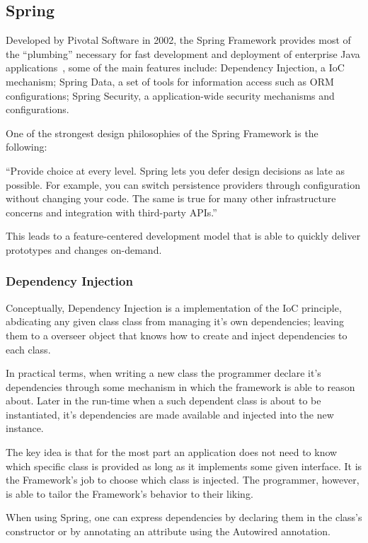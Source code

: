 \subsection{Spring}
Developed by Pivotal Software in 2002, the Spring Framework provides most of the ``plumbing'' necessary for fast development and deployment of enterprise Java applications~\cite{springdocs}, some of the main features include: Dependency Injection, a \gls{IoC} mechanism; Spring Data, a set of tools for information access such as \gls{ORM} configurations; Spring Security, a application-wide security mechanisms and configurations.

One of the strongest design philosophies of the Spring Framework is the following:
\begin{displayquote}
``Provide choice at every level. Spring lets you defer design decisions as late as possible. For example, you can switch persistence providers through configuration without changing your code. The same is true for many other infrastructure concerns and integration with third-party \gls{API}s.''~\cite{springdocs}
\end{displayquote}
This leads to a feature-centered development model that is able to quickly deliver prototypes and changes on-demand.

\subsubsection{Dependency Injection}
Conceptually, Dependency Injection is a implementation of the \gls{IoC} principle, abdicating any given class class from managing it's own dependencies; leaving them to a overseer object that knows how to create and inject dependencies to each class\cite{inversion}.

In practical terms, when writing a new class the programmer declare it's dependencies through some mechanism in which the framework is able to reason about. Later in the run-time when a such dependent class is about to be instantiated, it's dependencies are made available and injected into the new instance.

The key idea is that for the most part an application does not need to know which specific class is provided as long as it implements some given interface. It is the Framework's job to choose which class is injected. The programmer, however, is able to tailor the Framework's behavior to their liking.

When using Spring, one can express dependencies by declaring them in the class's constructor or by annotating an attribute using the Autowired annotation\cite{springdi}.

